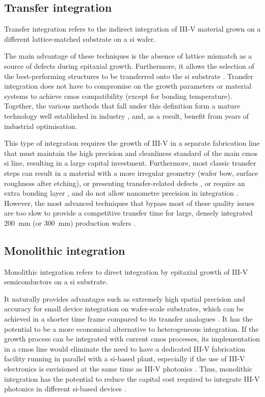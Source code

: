 \subsection{Transfer integration}

Transfer integration refers to the indirect integration of III-V material grown on a different lattice-matched substrate on a \acl{si} wafer. 

The main advantage of these techniques is the absence of lattice mismatch as a source of defects during epitaxial growth. Furthermore, it allows the selection of the best-performing structures to be transferred onto the \acl{si} substrate \cite{Zadeh2016, Wang2017}. Transfer integration does not have to compromise on the growth parameters or material systems to achieve \acs{cmos} compatibility (except for bonding temperature). Together, the various methods that fall under this definition form a mature technology well established in industry \cite{Han2022, Wang2017}, and, as a result, benefit from years of industrial optimisation.

This type of integration requires the growth of III-V in a separate fabrication line that must maintain the high precision and cleanliness standard of the main \acs{cmos} \acl{si} line, resulting in a large capital investment. Furthermore, most classic transfer steps can result in a material with a more irregular geometry (wafer bow, surface roughness after etching), or presenting transfer-related defects \cite{Jevtics2022}, or require an extra bonding layer \cite{Tang2019, Audet1997, Cheng2000, Sparks2001}, and do not allow nanometre precision in integration \cite{McPhillimy2020, Wang2017}. However, the most advanced techniques that bypass most of these quality issues are too slow to provide a competitive transfer time for large, densely integrated \qty{200}{\milli\metre} (or \qty{300}{\milli\metre}) production wafers \cite{McPhillimy2020, Wang2017}.

\subsection{Monolithic integration}

Monolithic integration refers to direct integration by epitaxial growth of III-V semiconductors on a \acl{si} substrate. 

It naturally provides advantages such as extremely high spatial precision and accuracy for small device integration on wafer-scale substrates, which can be achieved in a shorter time frame compared to its transfer analogues \cite{Wang2017, Wei2023}. It has the potential to be a more economical alternative to heterogeneous integration. If the growth process can be integrated with current \acs{cmos} processes, its implementation in a \acs{cmos} line would eliminate the need to have a dedicated III-V fabrication facility running in parallel with a \acl{si}-based plant, especially if the use of III-V electronics is envisioned at the same time as III-V photonics \cite{Wang2017}. Thus, monolithic integration has the potential to reduce the capital cost required to integrate III-V photonics in different \acl{si}-based devices \cite{Wang2017, Tang2019}.

